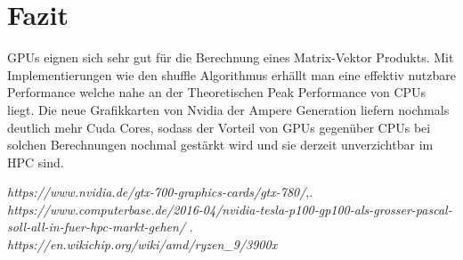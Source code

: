 \documentclass[10pt,a4paper]{article}
\begin{document}
	   \section{Fazit}
	   GPUs eignen sich sehr gut für die Berechnung eines Matrix-Vektor Produkts. Mit Implementierungen wie den shuffle Algorithmus erhällt man eine effektiv nutzbare Performance welche nahe an der Theoretischen Peak Performance von CPUs liegt. Die neue Grafikkarten von Nvidia der Ampere Generation liefern nochmals deutlich mehr Cuda Cores, sodass der Vorteil von GPUs gegenüber CPUs bei solchen Berechnungen nochmal gestärkt wird und sie derzeit unverzichtbar im HPC sind.  	     

	\newpage
	\begin{thebibliography}{3}
		 \textit{https://www.nvidia.de/gtx-700-graphics-cards/gtx-780/},.
		\textit{ https://www.computerbase.de/2016-04/nvidia-tesla-p100-gp100-als-grosser-pascal-soll-all-in-fuer-hpc-markt-gehen/} \label{P100 Performance}.
		 \textit{https://en.wikichip.org/wiki/amd/ryzen\_9/3900x}
	\end{thebibliography}
\end{document}
